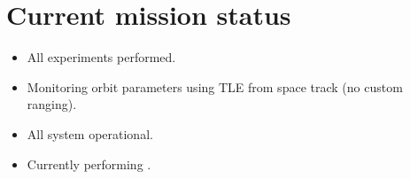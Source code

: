 \section{Current mission status}

\begin{itemize}    
 \item All experiments performed.
 \item Monitoring orbit parameters using TLE from space track (no custom ranging).
 \item All system operational.
 \item Currently performing .
\end{itemize}
